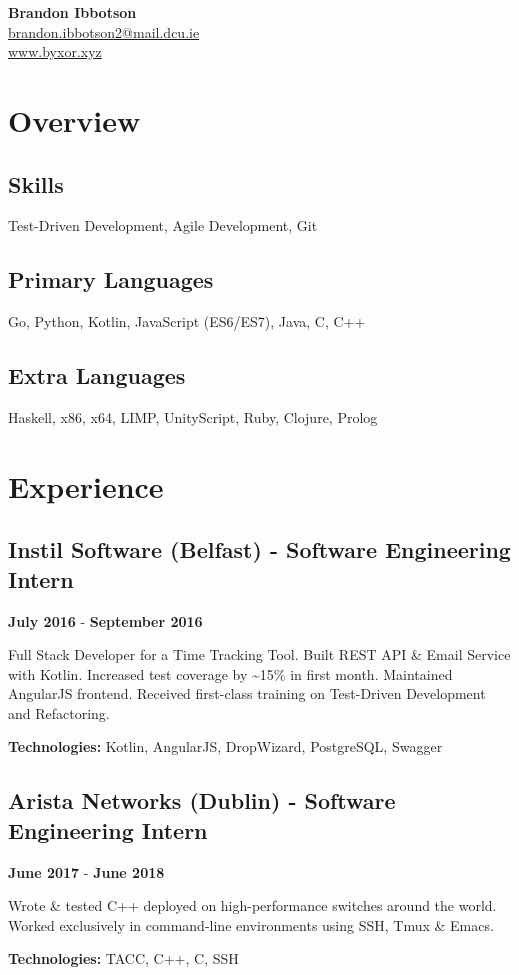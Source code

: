 \documentclass{article}
\newcommand{\youremail}[1]{\href{mailto:#1}{#1}}
\newcommand{\yourtitle}[3]{
  \begin{center}
    {\huge\bfseries #1}\\
    \vspace{.5em}
    \youremail{#2}\\
    \url{#3}\\
    \vspace{.7em}
  \end{center}
}
\begin{document}
\yourtitle{Brandon Ibbotson}{brandon.ibbotson2@mail.dcu.ie}{www.byxor.xyz}
\section{Overview}
\subsection{Skills}
Test-Driven Development, Agile Development, Git
\subsection{Primary Languages}
Go, Python, Kotlin, JavaScript (ES6/ES7), Java, C, C++
\subsection{Extra Languages}
Haskell, x86, x64, LIMP, UnityScript, Ruby, Clojure, Prolog
\section{Experience}
\subsection{Instil Software (Belfast) - Software Engineering Intern}
\textbf{July 2016} - \textbf{September 2016}

Full Stack Developer for a Time Tracking Tool. Built REST API \& Email Service with Kotlin. Increased test coverage by \textasciitilde{}15\% in first month. Maintained AngularJS frontend. Received first-class training on Test-Driven Development and Refactoring.

\textbf{Technologies: }Kotlin, AngularJS, DropWizard, PostgreSQL, Swagger
\vspace{0.5em}\subsection{Arista Networks (Dublin) - Software Engineering Intern}
\textbf{June 2017} - \textbf{June 2018}

Wrote \& tested C++ deployed on high-performance switches around the world. Worked exclusively in command-line environments using SSH, Tmux \& Emacs. 

\textbf{Technologies: }TACC, C++, C, SSH
\vspace{0.5em}
\end{document}
